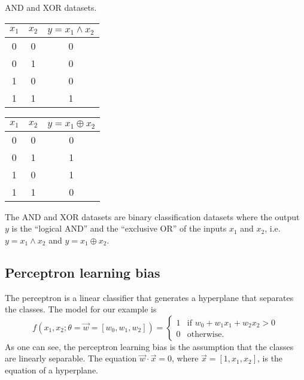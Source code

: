 \begin{tablebox}[label=tab:and-xor]{AND and XOR datasets.}
  \centering
  \begin{minipage}{0.45\textwidth}
    \centering
    \begin{tabular}{ccc}
      \toprule
      $x_1$ & $x_2$ & $y = x_1 \land x_2$ \\
      \midrule
      0 & 0 & 0 \\
      0 & 1 & 0 \\
      1 & 0 & 0 \\
      1 & 1 & 1 \\
      \bottomrule
    \end{tabular}
  \end{minipage}
  \begin{minipage}{0.45\textwidth}
  \centering
  \begin{tabular}{ccc}
    \toprule
    $x_1$ & $x_2$ & $y = x_1 \oplus x_2$ \\
    \midrule
    0 & 0 & 0 \\
    0 & 1 & 1 \\
    1 & 0 & 1 \\
    1 & 1 & 0 \\
    \bottomrule
  \end{tabular}
  \end{minipage}
  \tcblower
  The AND and XOR datasets are binary classification datasets where the output $y$ is the
  ``logical AND'' and the ``exclusive OR'' of the inputs $x_1$ and $x_2$, i.e.
  $y = x_1 \land x_2$ and $y = x_1 \oplus x_2$.
\end{tablebox}

\subsection{Perceptron learning bias}

The perceptron is a linear classifier that generates a hyperplane that separates the
classes.  The model for our example is
\begin{equation*}
  f(x_1, x_2; \theta = \vec{w} = \left[w_0, w_1, w_2\right]) =  \begin{cases}
    1 & \text{if } w_0 + w_1 x_1 + w_2 x_2 > 0 \\
    0 & \text{otherwise.}
  \end{cases}
\end{equation*}
As one can see, the perceptron learning bias is the assumption that the classes are
linearly separable. The equation $\vec{w} \cdot \vec{x} = 0$, where $\vec{x} = [1, x_1,
x_2]$, is the equation of a hyperplane.

